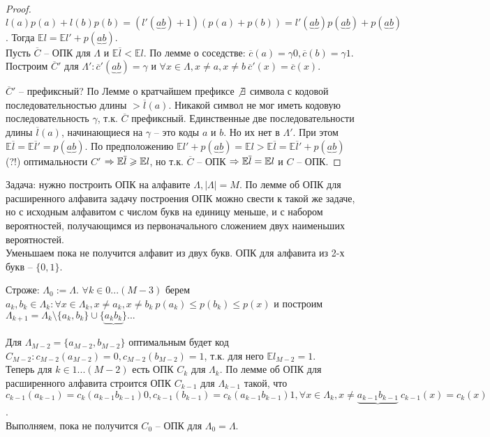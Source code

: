 	\begin{proof}
		$l(a) p(a) + l(b)p(b) = (l'(\underbrace{ab}) + 1)(p(a) + p(b)) = l'(\underbrace{ab})p(\underbrace{ab}) + p(\underbrace{ab})$. Тогда $\mathbb{E} l = \mathbb{E} l' + p(\underbrace{ab})$. \\
		Пусть $\overline{C}$ -- ОПК для $\Lambda$ и $\mathbb{E} \overline{l} < \mathbb{E} l$. По лемме о соседстве: $\overline{c}(a) = \gamma 0, \overline{c}(b) = \gamma 1$.
		Построим $\overline{C}'$ для $\Lambda' : \overline{c}'(\underbrace{ab}) = \gamma$ и $\forall x \in \Lambda, x \neq a, x \neq b \ \overline{c}'(x) = \overline{c}(x)$. 

		$\overline{C}'$ -- префиксный? По Лемме о кратчайшем префиксе $\not\exists $ символа с кодовой последовательностью длины $> \overline{l}(a)$.
		Никакой символ не мог иметь кодовую последовательность $\gamma$, т.к. $\overline{C}$ префиксный. Единственные две последовательности длины $\overline{l}(a)$, начинающиеся на $\gamma$ -- это коды $a$ и $b$.
		Но их нет в $\Lambda'$. При этом $\mathbb{E} \overline{l} = \mathbb{E} \overline{l}' = p(\underbrace{ab})$.
		По предположению $\mathbb{E}l' + p(\underbrace{ab}) = \mathbb{E}l > \mathbb{E} \overline{l} = \mathbb{E} \overline{l}' + p(\underbrace{ab})$ (?!) оптимальности $C'$ 
		$\Rightarrow \mathbb{E} \overline{l} \geqslant \mathbb{E}l$, но т.к. $\overline{C}$ -- ОПК $\Rightarrow \mathbb{E} \overline{l} = \mathbb{E} l$ и $C$ -- ОПК.
	\end{proof}

	Задача: нужно построить ОПК на алфавите $\Lambda, |\Lambda| = M$. По лемме об ОПК для расширенного алфавита задачу построения ОПК можно свести к такой же задаче, но с исходным алфавитом с числом букв на единицу меньше,
	и с набором вероятностей, получающимся из первоначального сложением двух наименьших вероятностей. \\
	Уменьшаем пока не получится алфавит из двух букв. ОПК для алфавита из 2-х букв -- $\{0, 1\}$.

	Строже: $\Lambda_0 := \Lambda$. $\forall k \in 0...(M - 3)$ берем $a_k, b_k \in \Lambda_k : \forall x \in \Lambda_k, x \neq a_k, x \neq b_k \ p(a_k) \leqslant p(b_k) \leqslant p(x)$ 
	и построим $\Lambda_{k + 1} = \Lambda_{k} \setminus \{a_k, b_k\} \cup \{\underbrace{a_kb_k}\}...$
	
	Для $\Lambda_{M - 2} = \{a_{M - 2}, b_{M - 2}\}$ оптимальным будет код $C_{M - 2} : c_{M - 2} (a_{M - 2}) = 0, c_{M - 2}(b_{M - 2}) = 1$,
	т.к. для него $\mathbb{E} l_{M - 2} = 1$. \\
	Теперь для $k \in 1 ... (M - 2)$ есть ОПК $C_k$ для $\Lambda_k$. По лемме об ОПК для расширенного алфавита строится ОПК $C_{k - 1}$ для $\Lambda_{k - 1}$ такой, что 
	$c_{k - 1} (a_{k - 1}) = c_k(a_{k - 1}b_{k - 1})0, c_{k - 1}(b_{k - 1}) = c_k (a_{k - 1}b_{k - 1})1, \forall x \in \Lambda_k, x \neq \underbrace{a_{k - 1}b_{k - 1}} \ c_{k - 1}(x) = c_k(x)$. \\
	Выполняем, пока не получится $C_0$ -- ОПК для $\Lambda_0 = \Lambda$.

